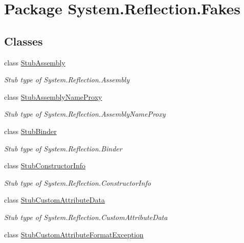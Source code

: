 \hypertarget{namespace_system_1_1_reflection_1_1_fakes}{\section{Package System.\-Reflection.\-Fakes}
\label{namespace_system_1_1_reflection_1_1_fakes}
}
\subsection*{Classes}
\begin{DoxyCompactItemize}
\item 
class \hyperlink{class_system_1_1_reflection_1_1_fakes_1_1_stub_assembly}{Stub\-Assembly}
\begin{DoxyCompactList}\small\item\em Stub type of System.\-Reflection.\-Assembly\end{DoxyCompactList}\item 
class \hyperlink{class_system_1_1_reflection_1_1_fakes_1_1_stub_assembly_name_proxy}{Stub\-Assembly\-Name\-Proxy}
\begin{DoxyCompactList}\small\item\em Stub type of System.\-Reflection.\-Assembly\-Name\-Proxy\end{DoxyCompactList}\item 
class \hyperlink{class_system_1_1_reflection_1_1_fakes_1_1_stub_binder}{Stub\-Binder}
\begin{DoxyCompactList}\small\item\em Stub type of System.\-Reflection.\-Binder\end{DoxyCompactList}\item 
class \hyperlink{class_system_1_1_reflection_1_1_fakes_1_1_stub_constructor_info}{Stub\-Constructor\-Info}
\begin{DoxyCompactList}\small\item\em Stub type of System.\-Reflection.\-Constructor\-Info\end{DoxyCompactList}\item 
class \hyperlink{class_system_1_1_reflection_1_1_fakes_1_1_stub_custom_attribute_data}{Stub\-Custom\-Attribute\-Data}
\begin{DoxyCompactList}\small\item\em Stub type of System.\-Reflection.\-Custom\-Attribute\-Data\end{DoxyCompactList}\item 
class \hyperlink{class_system_1_1_reflection_1_1_fakes_1_1_stub_custom_attribute_format_exception}{Stub\-Custom\-Attribute\-Format\-Exception}

\end{DoxyCompactItemize}
